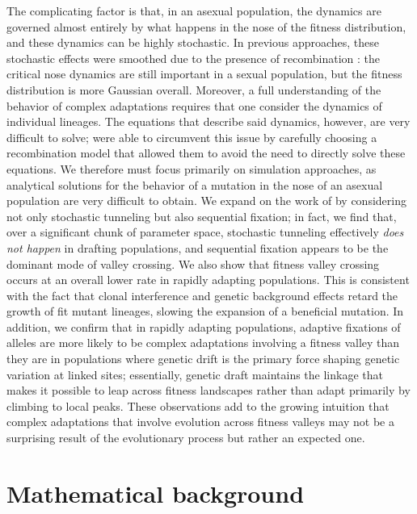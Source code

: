 \documentclass[10pt,twocolumn,twoside]{gsajnl}
\begin{document}
\begin{spacing}{1.5}
The complicating factor is that, in an asexual population, the dynamics are governed almost entirely by what happens in the nose of the fitness distribution, and these dynamics can be highly stochastic.
In previous approaches, these stochastic effects were smoothed due to the presence of recombination \citep{neher_shraiman_2011, neher_shraiman_2009}: the critical nose dynamics are still important in a sexual population, but the fitness distribution is more Gaussian overall.
Moreover, a full understanding of the behavior of complex adaptations requires that one consider the dynamics of individual lineages.
The equations that describe said dynamics, however, are very difficult to solve; \citet{neher_shraiman_2011} were able to circumvent this issue by carefully choosing a recombination model that allowed them to avoid the need to directly solve these equations.
We therefore must focus primarily on simulation approaches, as analytical solutions for the behavior of a mutation in the nose of an asexual population are very difficult to obtain.
We expand on the work of \citet{neher_shraiman_2011} by considering not only stochastic tunneling but also sequential fixation; in fact, we find that, over a significant chunk of parameter space, stochastic tunneling effectively \emph{does not happen} in drafting populations, and sequential fixation appears to be the dominant mode of valley crossing.
We also show that fitness valley crossing occurs at an overall lower rate in rapidly adapting populations.
This is consistent with the fact that clonal interference and genetic background effects retard the growth of fit mutant lineages, slowing the expansion of a beneficial mutation.
In addition, we confirm that in rapidly adapting populations, adaptive fixations of alleles are more likely to be complex adaptations involving a fitness valley than they are in populations where genetic drift is the primary force shaping genetic variation at linked sites; essentially, genetic draft maintains the linkage that makes it possible to leap across fitness landscapes rather than adapt primarily by climbing to local peaks.
These observations add to the growing intuition that complex adaptations that involve evolution across fitness valleys may not be a surprising result of the evolutionary process but rather an expected one.

\section{Mathematical background}


\end{spacing}
\end{document}
